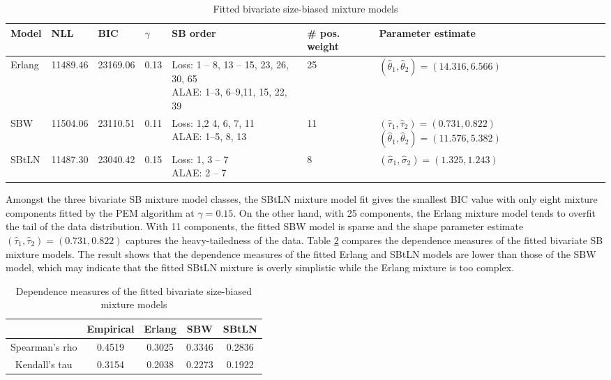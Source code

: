 \documentclass[11pt]{article}
\begin{document}
\begin{table}[h]
\centering
\scriptsize{
\begin{tabular}{lllllll}
\hline
  Model & NLL & BIC & $\gamma$ & SB order & \# pos. weight  & Parameter estimate\\
\hline
Erlang  &  11489.46 & 23169.06 &  0.13  & \makecell{Loss: 1 -- 8, 13 -- 15, 23, 26, 30, 65 \\ ALAE: 1--3, 6--9,11, 15, 22, 39}   &  25 & $(\hat{\theta}_1,\hat{\theta}_2)  = (14.316, 6.566)$   \\
SBW     &  11504.06 & 23110.51 & 0.11 & \makecell{Loss: 1,2 4, 6, 7, 11 \\ ALAE: 1--5, 8, 13}  & 11  & \makecell{$(\hat{\tau}_1, \hat{\tau}_2) = (0.731, 0.822)$\\ $(\hat{\theta}_1, \hat{\theta}_2) = (11.576, 5.382)$}      \\             
SBtLN   &  11487.30 & 23040.42 & 0.15   & \makecell{Loss: 1, 3 -- 7 \\ ALAE: 2 -- 7}     &  8 &$(\hat{\sigma}_1, \hat{\sigma}_2) = (1.325, 1.243)$                           \\               
\hline
\end{tabular}
}
\caption{Fitted bivariate size-biased mixture models}
\label{tab:BVfits}
\end{table}

Amongst the three bivariate SB mixture model classes, the SBtLN mixture model fit gives the smallest BIC value with only eight mixture components fitted by the PEM algorithm at $\gamma = 0.15$. On the other hand, with 25 components, the Erlang mixture model tends to overfit the tail of the data distribution. With 11 components, the fitted SBW model is sparse and the shape parameter estimate $(\hat{\tau}_1, \hat{\tau}_2) = (0.731, 0.822)$ captures the heavy-tailedness of the data. Table \ref{tab_dependence_fit} compares the dependence measures of the fitted bivariate SB mixture models. The result shows that the dependence measures of the fitted Erlang and SBtLN models are lower than those of the SBW model, which may indicate that the fitted SBtLN mixture is overly simplistic while the Erlang mixture is too complex.  

\begin{table}[h]
\centering
\begin{tabular}{ccccc}
\hline
                  & Empirical &  Erlang & SBW & SBtLN \\
\hline
 Spearman's rho   &  0.4519  & 0.3025  &  0.3346  &  0.2836   \\
 Kendall's tau    &  0.3154  & 0.2038  &  0.2273  &  0.1922   \\             
\hline
\end{tabular}
    \caption{Dependence measures of the fitted bivariate size-biased mixture models}
		\label{tab_dependence_fit}
\end{table}
\end{document}
